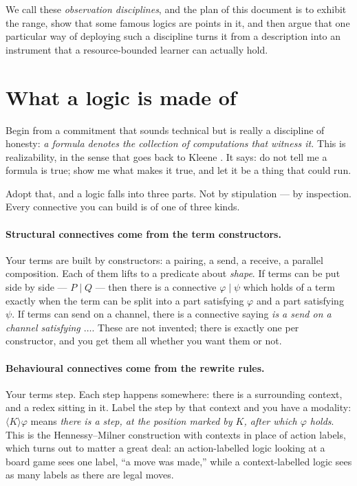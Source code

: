 We call these \emph{observation disciplines}, and the plan of this document is to
exhibit the range, show that some famous logics are points in it, and then argue
that one particular way of deploying such a discipline turns it from a description
into an instrument that a resource-bounded learner can actually hold.

\section{What a logic is made of}
\label{sec:0made}

Begin from a commitment that sounds technical but is really a discipline of
honesty: \emph{a formula denotes the collection of computations that witness it.}
This is realizability, in the sense that goes back to Kleene \cite{Kleene45}. It
says: do not tell me a formula is true; show me what makes it true, and let it be
a thing that could run.

Adopt that, and a logic falls into three parts. Not by stipulation --- by
inspection. Every connective you can build is of one of three kinds.

\paragraph{Structural connectives come from the term constructors.}
Your terms are built by constructors: a pairing, a send, a receive, a parallel
composition. Each of them lifts to a predicate about \emph{shape}. If terms can be
put side by side --- $P \mid Q$ --- then there is a connective $\varphi \mid \psi$
which holds of a term exactly when the term can be split into a part satisfying
$\varphi$ and a part satisfying $\psi$. If terms can send on a channel, there is a
connective saying \emph{is a send on a channel satisfying $\dots$}. These are not
invented; there is exactly one per constructor, and you get them all whether you
want them or not.

\paragraph{Behavioural connectives come from the rewrite rules.}
Your terms step. Each step happens somewhere: there is a surrounding context, and
a redex sitting in it. Label the step by that context and you have a modality:
$\langle K \rangle \varphi$ means \emph{there is a step, at the position marked by
$K$, after which $\varphi$ holds}. This is the Hennessy--Milner construction
\cite{HennessyMilner85} with contexts in place of action labels, which turns out
to matter a great deal: an action-labelled logic looking at a board game sees one
label, ``a move was made,'' while a context-labelled logic sees as many labels as
there are legal moves.


